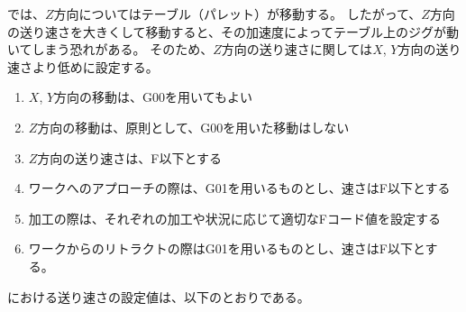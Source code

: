 \DMC では、$Z$方向についてはテーブル（パレット）が移動する。
したがって、$Z$方向の送り速さを大きくして移動すると、その加速度によってテーブル上のジグが動いてしまう恐れがある。
そのため、$Z$方向の送り速さに関しては$X$, $Y$方向の送り速さより低めに設定する。
\begin{enumerate}[label=\Roman*., ref=\Roman*]
\item $X$, $Y$方向の移動は、{\ttfamily G00}を用いてもよい
\item $Z$方向の移動は、原則として、{\ttfamily G00}を用いた移動はしない
\item $Z$方向の送り速さは、{\ttfamily F\SpindleRapidTraverseXY}以下とする
\item {}ワークへのアプローチの際は、{\ttfamily G01}を用いるものとし、速さは{\ttfamily F\SpindleRapidAproachFeedRateZ}以下とする
\item 加工の際は、それぞれの加工や状況に応じて適切なFコード値を設定する
\item ワークからのリトラクトの際は{\ttfamily G01}を用いるものとし、速さは{\ttfamily F\SpindleRapidTraverseXY}以下とする。
\end{enumerate}


\clearpage
\noindent
\dateKouguSpeed における送り速さの設定値は、以下のとおりである。\\

